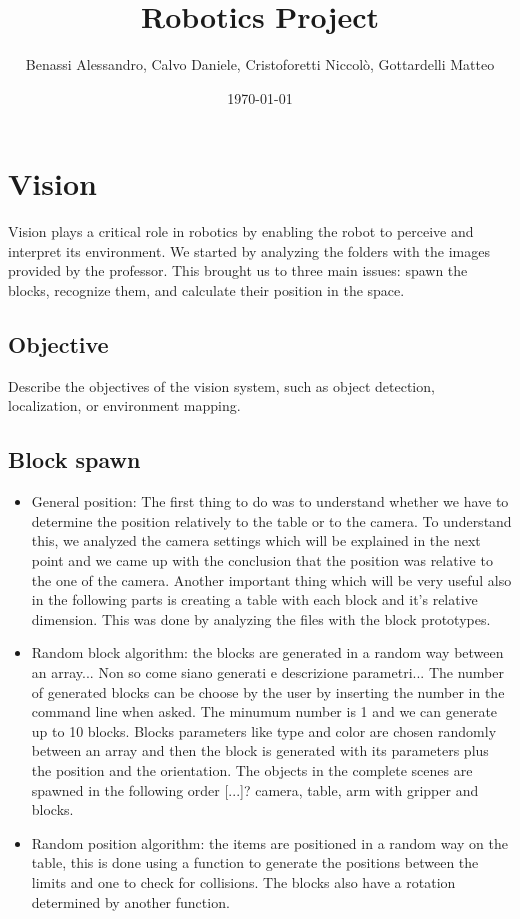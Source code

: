 \documentclass[12pt,a4paper]{article}
\title{Robotics Project}
\author{Benassi Alessandro, Calvo Daniele, Cristoforetti Niccolò, Gottardelli Matteo}
\date{\today}
\begin{document}
\maketitle
\tableofcontents
\newpage

\section{Vision}\label{sec:vision}
Vision plays a critical role in robotics by enabling the robot to perceive and interpret its environment. 
We started by analyzing the folders with the images provided by the professor. This brought us to three main issues: spawn the blocks, recognize them, and calculate their position in the space. 

\subsection{Objective}\label{subsec:vobj}
Describe the objectives of the vision system, such as object detection, localization, or environment mapping.

\subsection{Block spawn}\label{subsec:blockspawn}

\begin{itemize}
    \item General position: The first thing to do was to understand whether we have to determine the position relatively to the table or to the camera. To understand this, we analyzed the camera settings which will be explained in the next point and we came up with the conclusion that the position was relative to the one of the camera.
    Another important thing which will be very useful also in the following parts is creating a table with each block and it's relative dimension. This was done by analyzing the files with the block prototypes.
    \item Random block algorithm: the blocks are generated in a random way between an array... Non so come siano generati e descrizione parametri...
    The number of generated blocks can be choose by the user by inserting the number in the command line when asked. The minumum number is 1 and we can generate up to 10 blocks. Blocks parameters like type and color are chosen randomly between an array and then the block is generated with its parameters plus the position and the orientation.
    The objects in the complete scenes are spawned in the following order [...]? camera, table, arm with gripper and blocks.
    \item Random position algorithm: the items are positioned in a random way on the table, this is done using a function to generate the positions between the limits and one to check for collisions. The blocks also have a rotation determined by another function.
\end{itemize}
\end{document}
